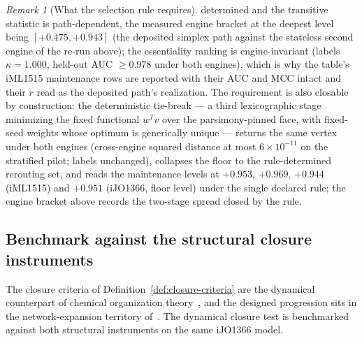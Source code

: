 \documentclass[11pt,a4paper]{article}
\theoremstyle{plain}
\theoremstyle{definition}
\theoremstyle{remark}
\newtheorem{remark}[theorem]{Remark}
\begin{document}
\begin{remark}[What the selection rule requires]
determined and the transitive statistic is path-dependent, the
measured engine bracket at the deepest level being
$[+0.475,+0.943]$ (the deposited simplex path against the stateless
second engine of the re-run above); the essentiality ranking is
engine-invariant (labels $\kappa=1.000$, held-out AUC $\ge0.978$
under both engines), which is why the table's iML1515 maintenance
rows are reported with their AUC and MCC intact and their $r$ read
as the deposited path's realization. The requirement is also
closable by construction: the deterministic tie-break --- a third
lexicographic stage minimizing the fixed functional $w^{T}v$ over
the parsimony-pinned face, with fixed-seed weights whose optimum is
generically unique --- returns the same vertex under both engines
(cross-engine squared distance at most $6\times10^{-11}$ on the
stratified pilot; labels unchanged), collapses the floor to the
rule-determined rerouting set, and reads the maintenance levels at
$+0.953$, $+0.969$, $+0.944$ (iML1515) and $+0.951$ (iJO1366, floor
level) under the single declared rule; the engine bracket above
records the two-stage spread closed by the rule.
\end{remark}

\subsection{Benchmark against the structural closure instruments}
\label{sec:network-keio-e14}

The closure criteria of Definition~\ref{def:closure-criteria} are
the dynamical counterpart of chemical organization
theory~\citep{dittrich2007cot}, and the designed progression sits
in the network-expansion territory of~\citet{handorf2005network}.
The dynamical closure test is benchmarked against both
structural instruments on the same iJO1366 model.
\end{document}
